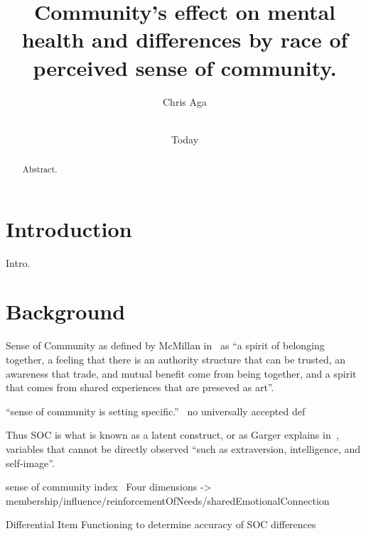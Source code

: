\documentclass{sig-alternate}
\begin{document}
\title{Community's effect on mental health and differences by race of perceived sense of community.}
\author{
\alignauthor
Chris Aga \\
 \\
}

\date{Today}

\maketitle


\begin{abstract}
Abstract.
\end{abstract}

\keywords{}

\section{Introduction}
Intro.


\section{Background}

Sense of Community as defined by McMillan in~\cite{senseOfCommunity:1996} as ``a spirit of belonging together, a feeling that there is an authority structure that can be trusted, an awareness that trade, and mutual benefit come from being together, and a spirit that comes from shared experiences that are preseved as art''.




``sense of
community is setting specific.''~\cite{cognitiveLearning:2002}
no universally accepted def

Thus SOC is what is known as a latent construct, or as Garger explains in~\cite{latent:2011}, variables that cannot be directly observed ``such as extraversion, intelligence, and self-image''.

sense of community index~\cite{disparities:2009}
Four dimensions -> membership/influence/reinforcementOfNeeds/sharedEmotionalConnection

Differential Item Functioning to determine accuracy of SOC differences
\end{document}
